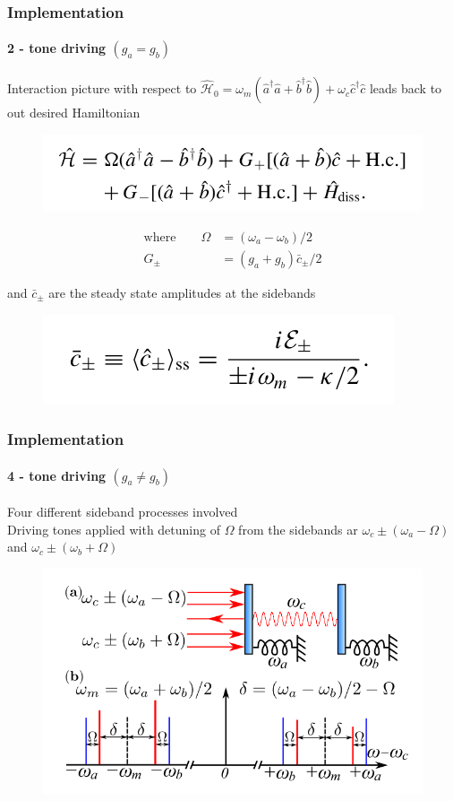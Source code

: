 \documentclass[aspectratio=43]{beamer}
\begin{document}
\begin{frame}
	
	\frametitle{Implementation}
	\framesubtitle{2 - tone driving $(g_{a} = g_{b})$}

	Interaction picture with respect to $\hat{\mathcal{H}}_{0} = \omega_{m}(\hat{a}^{\dagger}\hat{a} + \hat{b}^{\dagger}\hat{b}) + \omega_{c}\hat{c}^{\dagger}\hat{c}$ leads back to out desired Hamiltonian
	
	\begin{figure}
		\includegraphics[width = 7 cm]{plots/hamiltonian_4.png}
	\end{figure}
	
	\begin{align}
		\textrm{where} \qquad \Omega &= (\omega_{a} - \omega_{b}) / 2 \nonumber \\
		G_{\pm} &= (g_{a} + g_{b})\bar{c}_{\pm} / 2 \nonumber
	\end{align}
	
	\vspace{0.5 cm}
	
	and $\bar{c}_{\pm}$ are the steady state amplitudes at the sidebands
	\begin{figure}
		\includegraphics[width = 5 cm]{plots/ss_2_tone.png}
	\end{figure}

\end{frame}

\begin{frame}
	
	\frametitle{Implementation}
	\framesubtitle{4 - tone driving $(g_{a} \neq g_{b})$}
	
	Four different sideband processes involved\\
	Driving tones applied with detuning of $\Omega$ from the sidebands ar $\omega_{c} \pm (\omega_{a} - \Omega)$ and $\omega_{c} \pm (\omega_{b} + \Omega)$
	
	\begin{figure}
		\includegraphics[width = 7 cm]{plots/plot_4_tone.png}
	\end{figure}	

\end{frame}
\end{document}
